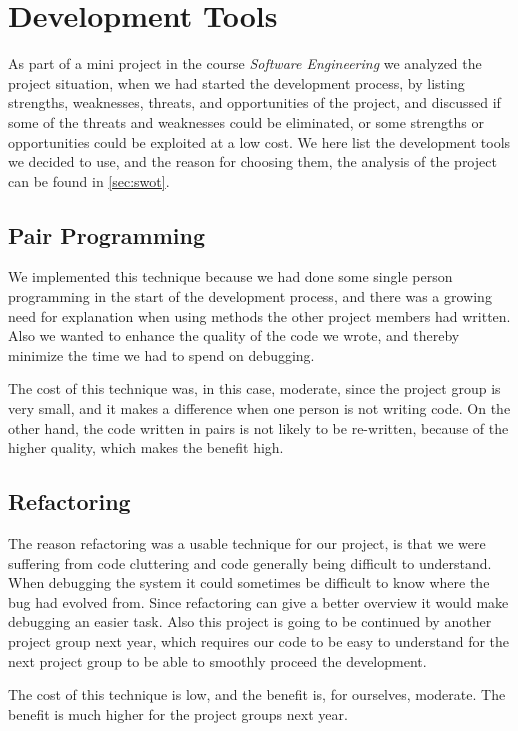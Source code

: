 \chapter{Development Tools}
	\label{cha:development_tools}
	As part of a mini project in the course \textit{Software Engineering} we analyzed the project situation, when we had started the development process, by listing strengths, weaknesses, threats, and opportunities of the project, and discussed if some of the threats and weaknesses could be eliminated, or some strengths or opportunities could be exploited at a low cost. We here list the development tools we decided to use, and the reason for choosing them, the analysis of the project can be found in \autoref{sec:swot}.
	
	\section*{Pair Programming}
		We implemented this technique because we had done some single person programming in the start of the development process, and there was a growing need for explanation when using methods the other project members had written. Also we wanted to enhance the quality of the code we wrote, and thereby minimize the time we had to spend on debugging.

The cost of this technique was, in this case, moderate, since the project group is very small, and it makes a difference when one person is not writing code. On the other hand, the code written in pairs is not likely to be re-written, because of the higher quality, which makes the benefit high.
	
	\section*{Refactoring}
	The reason refactoring was a usable technique for our project, is that we were suffering from code cluttering and code generally being difficult to understand. When debugging the system it could sometimes be difficult to know where the bug had evolved from. Since refactoring can give a better overview it would make debugging an easier task. Also this project is going to be continued by another project group next year, which requires our code to be easy to understand for the next project group to be able to smoothly proceed the development.

The cost of this technique is low, and the benefit is, for ourselves, moderate. The benefit is much higher for the project groups next year.